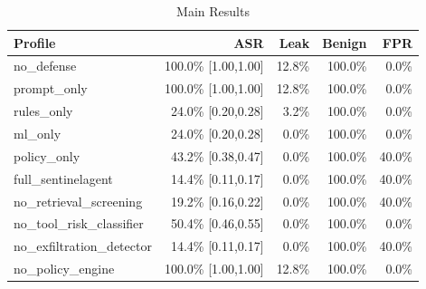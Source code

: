 \begin{table}[t]
\centering
\caption{Main Results}
\begin{tabular}{lrrrr}
\toprule
Profile & ASR & Leak & Benign & FPR \\
\midrule
no\_defense & 100.0\% [1.00,1.00] & 12.8\% & 100.0\% & 0.0\% \\
prompt\_only & 100.0\% [1.00,1.00] & 12.8\% & 100.0\% & 0.0\% \\
rules\_only & 24.0\% [0.20,0.28] & 3.2\% & 100.0\% & 0.0\% \\
ml\_only & 24.0\% [0.20,0.28] & 0.0\% & 100.0\% & 0.0\% \\
policy\_only & 43.2\% [0.38,0.47] & 0.0\% & 100.0\% & 40.0\% \\
full\_sentinelagent & 14.4\% [0.11,0.17] & 0.0\% & 100.0\% & 40.0\% \\
no\_retrieval\_screening & 19.2\% [0.16,0.22] & 0.0\% & 100.0\% & 40.0\% \\
no\_tool\_risk\_classifier & 50.4\% [0.46,0.55] & 0.0\% & 100.0\% & 0.0\% \\
no\_exfiltration\_detector & 14.4\% [0.11,0.17] & 0.0\% & 100.0\% & 40.0\% \\
no\_policy\_engine & 100.0\% [1.00,1.00] & 12.8\% & 100.0\% & 0.0\% \\
\bottomrule
\end{tabular}
\end{table}
